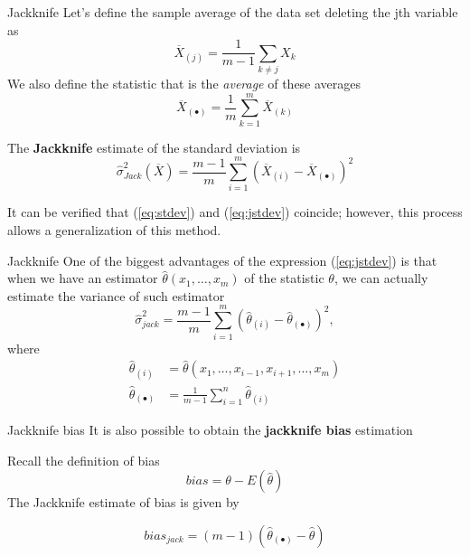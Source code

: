 \documentclass{beamer}
\begin{document}
\begin{frame}{Jackknife}
	Let's define the sample average of the data set deleting the jth variable as
	\begin{equation*}
		\overline{X}_{(j)}= \frac{1}{m-1} \sum_{k\ne j} X_k
	\end{equation*}
We also define the statistic that is the {\it average} of these averages
\begin{equation*}
	\overline{X}_{(\bullet)} = \frac{1}{m} \sum_{k=1}^m \overline{X}_{(k)}
\end{equation*}

The {\bf Jackknife} estimate of the standard deviation is
\begin{equation}
	\widehat{\sigma}_{Jack}^2(\overline{X})= \frac{m-1}{m} \sum_{i=1}^m (\overline{X}_{(i)} - \overline{X}_{(\bullet)})^2
\label{eq:jstdev}
\end{equation}

It can be verified that (\ref{eq:stdev}) and (\ref{eq:jstdev})  coincide; however, this process allows a generalization of this method.
\end{frame}

\begin{frame}{Jackknife}
	One of the biggest advantages of the expression (\ref{eq:jstdev}) is that when we  have an estimator $\hat{\theta}(x_1,\ldots, x_m)$ of the statistic $\theta$, we can actually estimate the variance of such estimator
	\begin{equation*}
		\hat{\sigma}_{jack}^2= \frac{m-1}{m} \sum_{i=1}^m (\hat{\theta}_{(i)}- \hat{\theta}_{(\bullet)})^2,
	\end{equation*}
where
\begin{equation*}
	\begin{split}
		\hat{\theta}_{(i)}&= \hat{\theta}(x_1, \ldots, x_{i-1},x_{i+1},\ldots, x_m) \\
		\hat{\theta}_{(\bullet)}&= \frac{1}{m-1} \sum_{i=1}^n \hat{\theta}_{(i)} 
	\end{split}
\end{equation*}

\end{frame}
		
\begin{frame}{Jackknife bias}
	It is also possible to obtain the {\bf jackknife bias} estimation
	
	Recall the definition of bias
	\begin{equation*}
		bias = \theta - E(\hat{\theta})
	\end{equation*} 
The Jackknife estimate of bias is given by

\begin{equation*}
	bias_{jack}= (m-1) (\hat{\theta}_{(\bullet)}- \hat{\theta})
\end{equation*}
\end{frame}		
		
\end{document}
